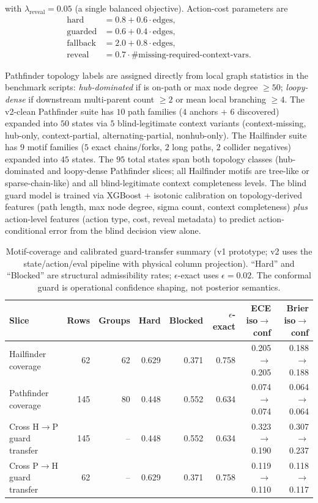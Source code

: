 \documentclass[11pt,openany]{report}
\begin{document}
with $\lambda_{\text{reveal}}=0.05$ (a single balanced objective).
Action-cost parameters are
\[
\begin{aligned}
\text{hard} &= 0.8 + 0.6\cdot \text{edges},\\
\text{guarded} &= 0.6 + 0.4\cdot \text{edges},\\
\text{fallback} &= 2.0 + 0.8\cdot \text{edges},\\
\text{reveal} &= 0.7\cdot \#\text{missing-required-context-vars}.
\end{aligned}
\]
\par
Pathfinder topology labels are assigned directly from local graph
statistics in the benchmark scripts:
\emph{hub-dominated} if  is on-path or max node degree
$\ge 50$; \emph{loopy-dense} if downstream multi-parent count $\ge 2$ or
mean local branching $\ge 4$.
The v2-clean Pathfinder suite has $10$ path families
($4$ anchors + $6$ discovered) expanded into $50$ states via $5$
blind-legitimate context variants (context-missing, hub-only,
context-partial, alternating-partial, nonhub-only).
The Hailfinder suite has $9$ motif families ($5$ exact chains/forks,
$2$ long paths, $2$ collider negatives) expanded into $45$ states.
The $95$ total states span both topology classes
(hub-dominated and loopy-dense Pathfinder slices;
all Hailfinder motifs are tree-like or sparse-chain-like) and all
blind-legitimate context completeness levels.
The blind guard model is trained via XGBoost + isotonic calibration
on topology-derived features (path length, max node degree, sigma
count, context completeness) \emph{plus} action-level features
(action type, cost, reveal metadata) to predict action-conditional
error from the blind decision view alone.

\begin{table}[ht]
\centering
\footnotesize
\renewcommand{\arraystretch}{1.03}
\begin{tabular}{@{}lrrrrrrr@{}}
\toprule
Slice & Rows & Groups & Hard & Blocked & $\epsilon$-exact & ECE iso$\to$conf & Brier iso$\to$conf \\
\midrule
Hailfinder coverage & 62 & 62 & 0.629 & 0.371 & 0.758 & 0.205$\to$0.205 & 0.188$\to$0.188 \\
Pathfinder coverage & 145 & 80 & 0.448 & 0.552 & 0.634 & 0.074$\to$0.074 & 0.064$\to$0.064 \\
Cross H$\to$P guard transfer & 145 & -- & 0.448 & 0.552 & 0.634 & 0.323$\to$0.190 & 0.307$\to$0.237 \\
Cross P$\to$H guard transfer & 62 & -- & 0.629 & 0.371 & 0.758 & 0.119$\to$0.110 & 0.118$\to$0.117 \\
\bottomrule
\end{tabular}
\renewcommand{\arraystretch}{1}
\caption{Motif-coverage and calibrated guard-transfer summary (v1 prototype; v2 uses the state/action/eval pipeline with physical column projection).
``Hard'' and ``Blocked'' are structural admissibility rates;
$\epsilon$-exact uses $\epsilon=0.02$. The conformal guard is operational
confidence shaping, not posterior semantics.}
\label{tab:prob-guarded-coverage-calibration}
\end{table}
\end{document}
